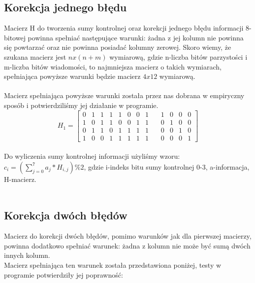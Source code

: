 \documentclass[a4paper, portrait,11pt]{article}
\begin{document}
\subsection*{Korekcja jednego błędu}
Macierz H do tworzenia sumy kontrolnej oraz korekcji jednego błędu informacji 8-bitowej 
powinna spełniać następujące warunki: żadna z jej kolumn nie powinna się powtarzać oraz nie powinna 
posiadać kolumny zerowej. Skoro wiemy, że szukana macierz jest $n x (n+m)$ wymiarową, gdzie 
n-liczba bitów parzystości i m-liczba bitów wiadomości, to najmniejsza macierz o takich wymiarach, 
spełniająca powyższe warunki będzie macierz $4 x 12$ wymiarową.\\
\\
Macierz spełniająca powyższe warunki została przez nas dobrana w empiryczny sposób i potwierdziliśmy 
jej działanie w programie.\\

$$H_1 = \left[\begin{array}{ccccccccccccc}
0 & 1 & 1 & 1 & 1 & 0 & 0 & 1 & \, & 1 & 0 & 0 & 0 \\
1 & 0 & 1 & 1 & 0 & 0 & 1 & 1 & \, & 0 & 1 & 0 & 0 \\
0 & 1 & 1 & 0 & 1 & 1 & 1 & 1 & \, & 0 & 0 & 1 & 0 \\
1 & 0 & 0 & 1 & 1 & 1 & 1 & 1 & \, & 0 & 0 & 0 & 1
\end{array}\right]$$
\\
Do wyliczenia sumy kontrolnej informacji użyliśmy wzoru:\\

$c_i = (\displaystyle\sum_{j=0}^{7} a_j*H_{i,j}) \% 2$, 
gdzie i-indeks bitu sumy kontrolnej {0-3}, a-informacja, H-macierz.\\
\\

\subsection*{Korekcja dwóch błędów}
Macierz do korekcji dwóch błędów, pomimo warunków jak dla pierwszej macierzy, powinna dodatkowo 
spełniać warunek: żadna z kolumn nie może być sumą dwóch innych kolumn.\\
Macierz spełniająca ten warunek została przedstawiona poniżej, testy w programie 
potwierdziły jej poprawność:
\end{document}
